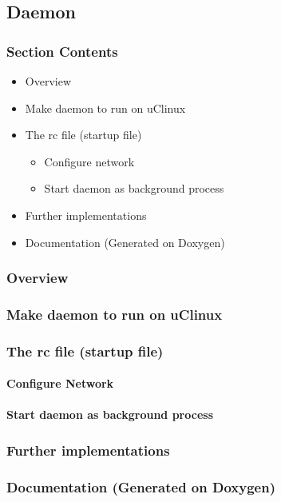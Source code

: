\subsection{Daemon}
\subsubsection{Section Contents}
\begin{itemize}
	\item Overview
	\item Make daemon to run on uClinux
	\item The rc file (startup file)
	\begin{itemize}
		\item Configure network
		\item Start daemon as background process
	\end{itemize}
	\item Further implementations
	\item Documentation (Generated on Doxygen)
\end{itemize}

\subsubsection{Overview}
\subsubsection{Make daemon to run on uClinux}
\subsubsection{The rc file (startup file)}
\paragraph{Configure Network}
\paragraph{Start daemon as background process}
\subsubsection{Further implementations}
\subsubsection{Documentation (Generated on Doxygen)}



